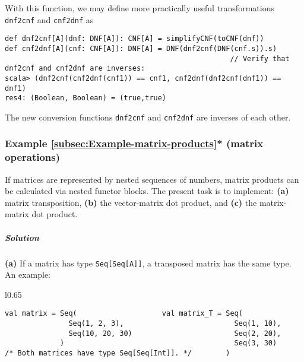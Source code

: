 With this function, we may define more practically useful transformations
\lstinline!dnf2cnf! and \lstinline!cnf2dnf! as
\begin{lstlisting}
def dnf2cnf[A](dnf: DNF[A]): CNF[A] = simplifyCNF(toCNF(dnf))
def cnf2dnf[A](cnf: CNF[A]): DNF[A] = DNF(dnf2cnf(DNF(cnf.s)).s)
                                                     // Verify that dnf2cnf and cnf2dnf are inverses:
scala> (dnf2cnf(cnf2dnf(cnf1)) == cnf1, cnf2dnf(dnf2cnf(dnf1)) == dnf1)
res4: (Boolean, Boolean) = (true,true)
\end{lstlisting}
The new conversion functions \lstinline!dnf2cnf! and \lstinline!cnf2dnf!
are inverses of each other.

\subsubsection{Example \label{subsec:Example-matrix-products}\ref{subsec:Example-matrix-products}{*}
(matrix operations)}

If matrices are represented by nested sequences of numbers, matrix
products can be calculated via nested functor blocks. The present
task is to implement: \textbf{(a)} matrix transposition, \textbf{(b)}
the vector-matrix dot product, and \textbf{(c)} the matrix-matrix
dot product.

\subparagraph{Solution}

\textbf{(a)} If a matrix has type \lstinline!Seq[Seq[A]]!, a transposed
matrix has the same type. An example:

\begin{wrapfigure}{l}{0.65\columnwidth}%
\vspace{-0.85\baselineskip}
\begin{lstlisting}
val matrix = Seq(                    val matrix_T = Seq(
               Seq(1, 2, 3),                          Seq(1, 10),
               Seq(10, 20, 30)                        Seq(2, 20),
             )                                        Seq(3, 30)
/* Both matrices have type Seq[Seq[Int]]. */        )
\end{lstlisting}
\vspace{-0.95\baselineskip}
\end{wrapfigure}%

